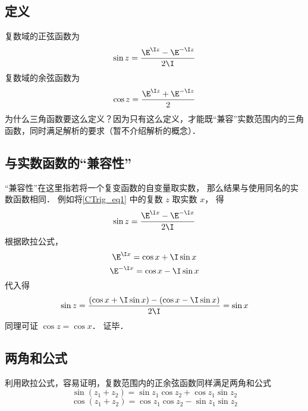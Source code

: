 
\subsection{定义}
复数域的正弦函数为
\begin{equation}\label{CTrig_eq1}
\sin z = \frac{\E^{\I z} - \E^{-\I z}}{2\I}
\end{equation}
复数域的余弦函数为
\begin{equation}\label{CTrig_eq2}
\cos z = \frac{\E^{\I z} + \E^{-\I z}}{2}
\end{equation}
为什么三角函数要这么定义？因为只有这么定义，才能既“兼容”实数范围内的三角函数，同时满足解析的要求（暂不介绍解析的概念）．

\subsection{与实数函数的“兼容性”}
“兼容性”在这里指若将一个复变函数的自变量取实数， 那么结果与使用同名的实数函数相同． 例如将\autoref{CTrig_eq1} 中的复数 $z$ 取实数 $x$， 得
\begin{equation}
\sin z = \frac{\E^{\I x} - \E^{-\I x}}{2\I}
\end{equation} 
根据欧拉公式，
\begin{equation}
\E^{\I x} = \cos x + \I\sin x
\end{equation} 
\begin{equation}
\E^{-\I x} = \cos x - \I \sin x
\end{equation} 
代入得
\begin{equation}
\sin z = \frac{(\cos x + \I\sin x) - (\cos x - \I\sin x)}{2\I} = \sin x
\end{equation}  
同理可证 $\cos z = \cos x$． 证毕．

\subsection{两角和公式}
利用欧拉公式，容易证明，复数范围内的正余弦函数同样满足两角和公式
\begin{equation}\label{CTrig_eq3}
\sin(z_1 + z_2) = \sin {z_1}\cos {z_2} + \cos {z_1}\sin {z_2}
\end{equation}
\begin{equation}\label{CTrig_eq4}
\cos (z_1 + z_2) = \cos {z_1}\cos {z_2} - \sin {z_1}\sin {z_2}
\end{equation}
